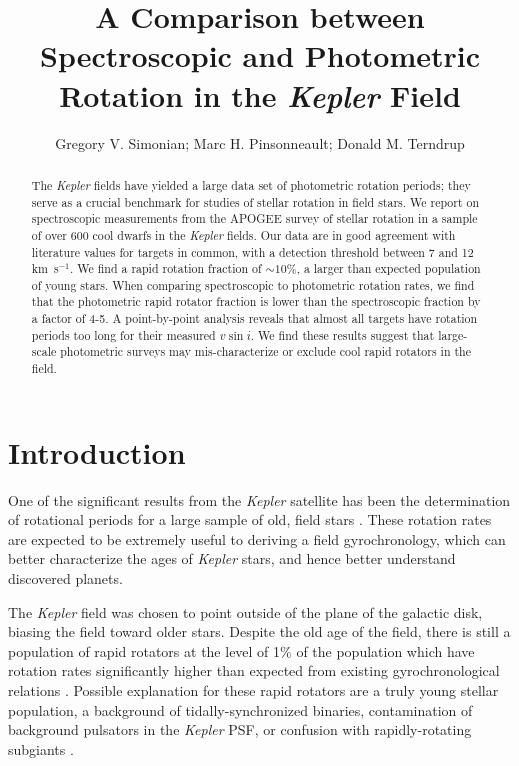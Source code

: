 \documentclass[manuscript]{aastex6}
\newcommand{\vsini}{\ensuremath{v \sin i}}
\newcommand{\Kepler}{\mbox{\textit{Kepler}}}
\newcommand{\kms}{\textrm{ km~s}\ensuremath{^{-1}}}
\begin{document}
\title{A Comparison between Spectroscopic and Photometric Rotation in the
\Kepler{} Field}
\author{Gregory V. Simonian; Marc H. Pinsonneault; Donald M. Terndrup}

\begin{abstract}
    The \Kepler{} fields have yielded a large data set of photometric rotation
    periods; they serve as a crucial benchmark for studies of stellar rotation
    in field stars. We report on spectroscopic measurements from the APOGEE
    survey of stellar rotation in a sample of over 600 cool dwarfs in the
    \Kepler{} fields. Our data are in good agreement with literature values for
    targets in common, with a detection threshold between 7 and 12 \kms. We
    find a rapid rotation fraction of \(\sim 10\%\), a larger than expected
    population of young stars. When comparing spectroscopic to photometric
    rotation rates, we find that the photometric rapid rotator fraction is
    lower than the spectroscopic fraction by a factor of 4-5. A point-by-point
    analysis reveals that almost all targets have rotation periods too long for
    their measured \vsini{}. We find these results suggest that large-scale
    photometric surveys may mis-characterize or exclude cool rapid rotators in
    the field.
\end{abstract}

\section{Introduction}

One of the significant results from the \Kepler{} satellite has been the
determination of rotational periods for a large sample of old, field stars
\citep{Basri11,Affer12,Nielsen13,Reinhold13,McQuillan14,Garcia14}.
These rotation rates are expected to be extremely useful to deriving a field
gyrochronology, which can better characterize the ages of
\Kepler{} stars, and hence better understand discovered planets.

The \Kepler{} field was chosen to point outside of the plane of the galactic
disk, biasing the field toward older stars. Despite the old age of the
field, there is still a population of rapid rotators at the level of 1\% of the
population which have rotation rates significantly higher than expected from
existing gyrochronological relations \citep{McQuillan14}. Possible explanation
for these rapid rotators are a truly young stellar population, a background of
tidally-synchronized binaries, contamination of background pulsators in the
\Kepler{} PSF, or confusion with rapidly-rotating subgiants \citep{vanSaders13}. 
\end{document}
